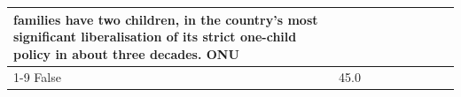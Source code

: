 \begin{table}[H]
\begin{tabular}{lllrlllll}
families have two children, in the country's most significant liberalisation of its strict one-child policy in about three decades. ONU \\
\cline{1-9}
False & 45.0%
\end{tabular}
\end{table}
